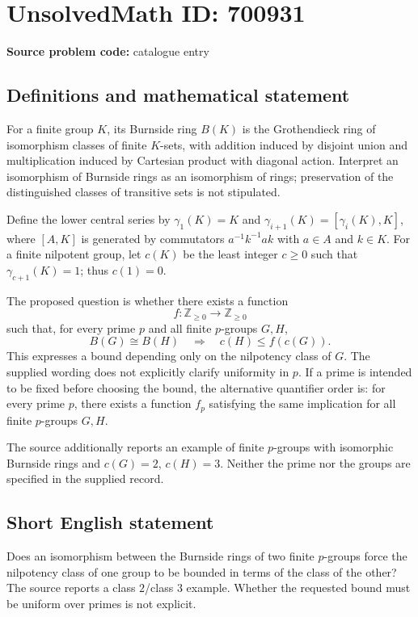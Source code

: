 \documentclass[11pt]{article}
\begin{document}
\section*{UnsolvedMath ID: 700931}
\textbf{Source problem code:} catalogue entry
\subsection{Definitions and mathematical statement}
For a finite group \(K\), its Burnside ring \(B(K)\) is the Grothendieck ring of isomorphism classes of finite \(K\)-sets, with addition induced by disjoint union and multiplication induced by Cartesian product with diagonal action. Interpret an isomorphism of Burnside rings as an isomorphism of rings; preservation of the distinguished classes of transitive sets is not stipulated.

Define the lower central series by \(\gamma_1(K)=K\) and \(\gamma_{i+1}(K)=[\gamma_i(K),K]\), where \([A,K]\) is generated by commutators \(a^{-1}k^{-1}ak\) with \(a\in A\) and \(k\in K\). For a finite nilpotent group, let \(c(K)\) be the least integer \(c\geq 0\) such that \(\gamma_{c+1}(K)=1\); thus \(c(1)=0\).

The proposed question is whether there exists a function
\[
 f:\mathbb Z_{\geq 0}\longrightarrow\mathbb Z_{\geq 0}
\]
such that, for every prime \(p\) and all finite \(p\)-groups \(G,H\),
\[
 B(G)\cong B(H)\quad\Longrightarrow\quad c(H)\leq f(c(G)).
\]
This expresses a bound depending only on the nilpotency class of \(G\). The supplied wording does not explicitly clarify uniformity in \(p\). If a prime is intended to be fixed before choosing the bound, the alternative quantifier order is: for every prime \(p\), there exists a function \(f_p\) satisfying the same implication for all finite \(p\)-groups \(G,H\).

The source additionally reports an example of finite \(p\)-groups with isomorphic Burnside rings and \(c(G)=2\), \(c(H)=3\). Neither the prime nor the groups are specified in the supplied record.
\subsection{Short English statement}
Does an isomorphism between the Burnside rings of two finite \(p\)-groups force the nilpotency class of one group to be bounded in terms of the class of the other? The source reports a class \(2\)/class \(3\) example. Whether the requested bound must be uniform over primes is not explicit.
\end{document}
